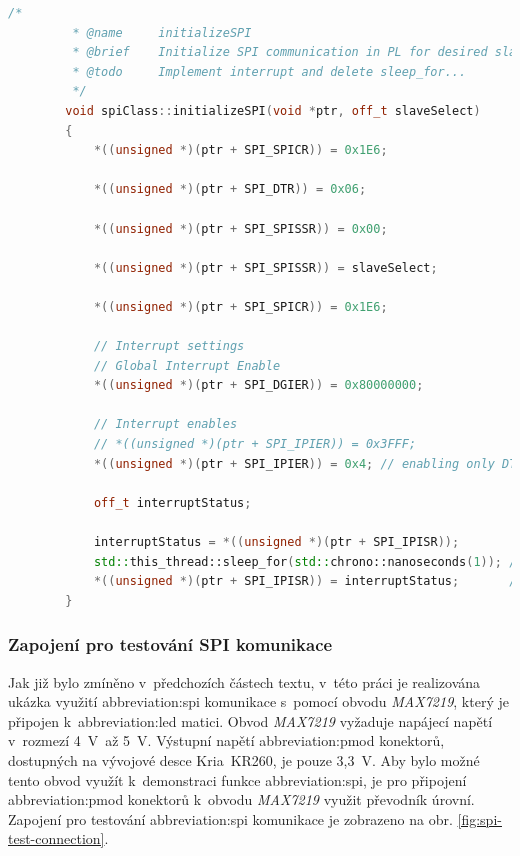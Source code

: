 \documentclass[a4paper, twoside, 11pt]{article}
\begin{document}
	\begin{lstlisting}[language={c++}, caption={Algoritmus inicializace \gls{abbreviation:axi} Quad \gls{abbreviation:spi} jednotky v~C++.}, label={lst:initialize-spi}]
		/*
		 * @name     initializeSPI
		 * @brief    Initialize SPI communication in PL for desired slave and mapped device.
		 * @todo     Implement interrupt and delete sleep_for...
		 */
		void spiClass::initializeSPI(void *ptr, off_t slaveSelect)
		{
			*((unsigned *)(ptr + SPI_SPICR)) = 0x1E6;
		
			*((unsigned *)(ptr + SPI_DTR)) = 0x06;
		
			*((unsigned *)(ptr + SPI_SPISSR)) = 0x00;
		
			*((unsigned *)(ptr + SPI_SPISSR)) = slaveSelect;
		
			*((unsigned *)(ptr + SPI_SPICR)) = 0x1E6;
		
			// Interrupt settings
			// Global Interrupt Enable
			*((unsigned *)(ptr + SPI_DGIER)) = 0x80000000;
		
			// Interrupt enables
			// *((unsigned *)(ptr + SPI_IPIER)) = 0x3FFF;               // enabling all interrupts
			*((unsigned *)(ptr + SPI_IPIER)) = 0x4; // enabling only DTR is clear INT
		
			off_t interruptStatus;
		
			interruptStatus = *((unsigned *)(ptr + SPI_IPISR));
			std::this_thread::sleep_for(std::chrono::nanoseconds(1)); // could not resolve other way now, because reading and writing to register takes more time that one tick probably
			*((unsigned *)(ptr + SPI_IPISR)) = interruptStatus;       // resetting SPI interrupt status register
		}\end{lstlisting}
		
	
	
	\subsubsection{Zapojení pro testování SPI komunikace}\label{subsubsec:zapojeni-pro-testovani-spi-komunikace}
	Jak již bylo zmíněno v~předchozích částech textu, v~této práci je realizována ukázka využití \gls{abbreviation:spi} komunikace s~pomocí obvodu \textit{MAX7219}, který je připojen k~\gls{abbreviation:led} matici.
	Obvod \textit{MAX7219} vyžaduje napájecí napětí v~rozmezí 4~V~až 5~V. Výstupní napětí \gls{abbreviation:pmod} konektorů, dostupných na vývojové desce Kria~KR260, je pouze 3,3~V. Aby bylo možné tento obvod využít k~demonstraci funkce \gls{abbreviation:spi}, je pro připojení \gls{abbreviation:pmod} konektorů k~obvodu \textit{MAX7219} využit převodník úrovní. Zapojení pro testování \gls{abbreviation:spi} komunikace je zobrazeno na obr. \ref{fig:spi-test-connection}.\par
\end{document}

